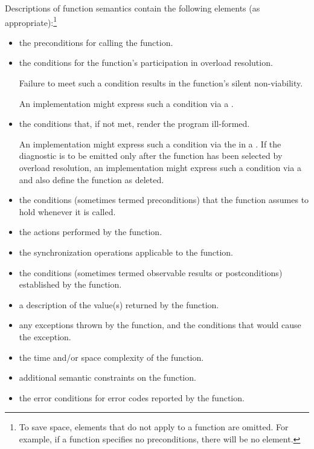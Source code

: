 \pnum
Descriptions of function semantics contain the following elements (as
appropriate):\footnote{To save space, elements that do not apply to a function are omitted.
For example, if a function specifies no
preconditions, there will be no \expects element.}

\begin{itemize}
\item
\requires the preconditions for calling the function.

\item
\constraints the conditions for the function's participation
in overload resolution.
\begin{note}
Failure to meet such a condition results in the function's silent non-viability.
\end{note}
\begin{example}
An implementation might express such a condition
via a .
\end{example}

\item
\mandates
the conditions that, if not met, render the program ill-formed.
\begin{example}
An implementation might express such a condition
via the 
in a .
If the diagnostic is to be emitted only after the function
has been selected by overload resolution,
an implementation might express such a condition
via a 
and also define the function as deleted.
\end{example}

\item
\expects
the conditions (sometimes termed preconditions)
that the function assumes to hold whenever it is called.

\item
\effects
the actions performed by the function.

\item
\sync
the synchronization operations applicable to the function.

\item
\ensures
the conditions (sometimes termed observable results or postconditions)
established by the function.

\item
\returns
a description of the value(s) returned by the function.

\item
\throws
any exceptions thrown by the function, and the conditions that would cause the exception.

\item
\complexity
the time and/or space complexity of the function.

\item
\remarks
additional semantic constraints on the function.

\item
\errors
the error conditions for error codes reported by the function.
\end{itemize}

